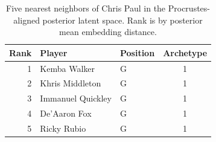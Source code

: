 \begin{table}[htbp]
  \centering\small
  \begin{tabular}{rllc}
    \toprule
    Rank & Player & Position & Archetype \\
    \midrule
    1 & Kemba Walker & G & 1 \\
    2 & Khris Middleton & G & 1 \\
    3 & Immanuel Quickley & G & 1 \\
    4 & De'Aaron Fox & G & 1 \\
    5 & Ricky Rubio & G & 1 \\
    \bottomrule
  \end{tabular}
  \caption{Five nearest neighbors of Chris Paul in the Procrustes-aligned posterior latent space. Rank is by posterior mean embedding distance.}
  \label{tab:Chris_Paul_neighbors}
\end{table}

